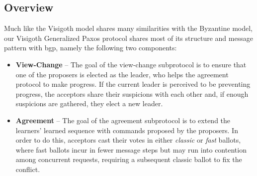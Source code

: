 \subsection{Overview}
Much like the Visigoth model shares many similarities with the Byzantine model, our Visigoth Generalized Paxos protocol shares most of its structure and message pattern with \acrshort{bgp}, namely the following two components:
\begin{itemize}
	\item 
	\textbf{View-Change} -- The goal of the view-change subprotocol is to ensure that one of the proposers is elected as the leader, who helps the agreement protocol to make progress. If the current leader is perceived to be preventing progress, the acceptors share their suspicions with each other and, if enough suspicions are gathered, they elect a new leader. 
	
	\item 
	\textbf{Agreement} -- The goal of the agreement subprotocol is to extend the learners' learned sequence with commands proposed by the proposers. In order to do this, acceptors cast their votes in either \textit{classic} or \textit{fast} ballots, where fast ballots incur in fewer message steps but may run into contention among concurrent requests, requiring a subsequent classic ballot to fix the conflict.
\end{itemize}


